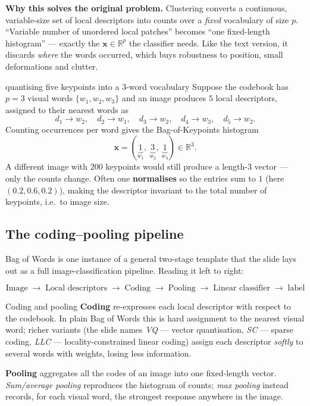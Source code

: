 \documentclass{report}
\newcommand{\R}{\mathbb{R}}
\newcommand{\xvec}{\mathbf{x}}
\begin{document}
\begin{keybox}
\textbf{Why this solves the original problem.} Clustering converts a continuous,
variable-size set of local descriptors into counts over a \emph{fixed}
vocabulary of size $p$. ``Variable number of unordered local patches'' becomes
``one fixed-length histogram'' --- exactly the $\xvec\in\R^p$ the classifier
needs. Like the text version, it discards \emph{where} the words occurred,
which buys robustness to position, small deformations and clutter.
\end{keybox}

\begin{exbox}{quantising five keypoints into a 3-word vocabulary}
Suppose the codebook has $p=3$ visual words $\{w_1,w_2,w_3\}$ and an image
produces $5$ local descriptors, assigned to their nearest words as
\[
d_1\!\to\! w_2,\quad d_2\!\to\! w_1,\quad d_3\!\to\! w_2,\quad
d_4\!\to\! w_3,\quad d_5\!\to\! w_2 .
\]
Counting occurrences per word gives the Bag-of-Keypoints histogram
\[
\xvec = (\underbrace{1}_{w_1},\ \underbrace{3}_{w_2},\ \underbrace{1}_{w_3})
\in \R^3 .
\]
A different image with $200$ keypoints would still produce a length-$3$ vector
--- only the counts change. Often one \textbf{normalises} so the entries sum to
$1$ (here $(0.2,0.6,0.2)$), making the descriptor invariant to the total number
of keypoints, i.e.\ to image size.
\end{exbox}

\subsection{The coding--pooling pipeline}

Bag of Words is one instance of a general two-stage template that the slide lays
out as a full image-classification pipeline. Reading it left to right:

\[
\text{Image} \;\to\;
\boxed{\text{Local descriptors}} \;\to\;
\boxed{\text{Coding}} \;\to\;
\boxed{\text{Pooling}} \;\to\;
\boxed{\text{Linear classifier}} \;\to\; \text{label}
\]

\begin{defbox}{Coding and pooling}
\textbf{Coding} re-expresses each local descriptor with respect to the codebook.
In plain Bag of Words this is hard assignment to the nearest visual word; richer
variants (the slide names \emph{VQ} --- vector quantisation, \emph{SC} ---
sparse coding, \emph{LLC} --- locality-constrained linear coding) assign each
descriptor \emph{softly} to several words with weights, losing less information.

\medskip
\textbf{Pooling} aggregates all the codes of an image into one fixed-length
vector. \emph{Sum/average pooling} reproduces the histogram of counts;
\emph{max pooling} instead records, for each visual word, the strongest
response anywhere in the image.
\end{defbox}
\end{document}
